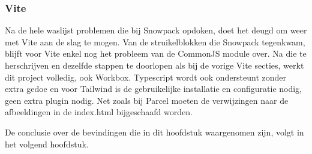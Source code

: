 \subsubsection{Vite}
Na de hele waslijst problemen die bij Snowpack opdoken, doet het deugd om weer met Vite aan de slag te mogen. Van de struikelblokken die Snowpack tegenkwam, blijft voor Vite enkel nog het probleem van de CommonJS module over. Na die te herschrijven en dezelfde stappen te doorlopen als bij de vorige Vite secties, werkt dit project volledig, ook Workbox. Typescript wordt ook ondersteunt zonder extra gedoe en voor Tailwind is de gebruikelijke installatie en configuratie nodig, geen extra plugin nodig. Net zoals bij Parcel moeten de verwijzingen naar de afbeeldingen in de index.html bijgeschaafd worden. 


De conclusie over de bevindingen die in dit hoofdstuk waargenomen zijn, volgt in het volgend hoofdstuk. 

